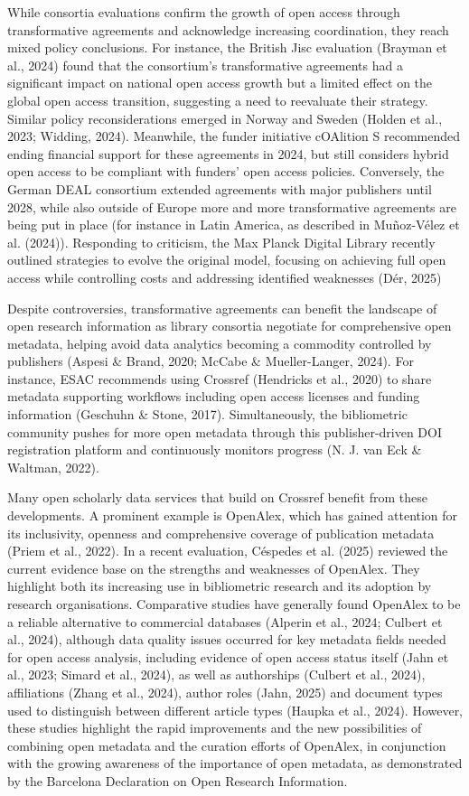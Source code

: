 \documentclass[a4paper,man,floatsintext,longtable,noextraspace,10pt]{apa6}
\begin{document}
While consortia evaluations confirm the growth of open access through
transformative agreements and acknowledge increasing coordination, they
reach mixed policy conclusions. For instance, the British Jisc
evaluation (Brayman et al., 2024) found that the consortium's
transformative agreements had a significant impact on national open
access growth but a limited effect on the global open access transition,
suggesting a need to reevaluate their strategy. Similar policy
reconsiderations emerged in Norway and Sweden (Holden et al., 2023;
Widding, 2024). Meanwhile, the funder initiative cOAlition S recommended
ending financial support for these agreements in 2024, but still
considers hybrid open access to be compliant with funders' open access
policies. Conversely, the German DEAL consortium extended agreements
with major publishers until 2028, while also outside of Europe more and
more transformative agreements are being put in place (for instance in
Latin America, as described in Muñoz-Vélez et al. (2024)). Responding to
criticism, the Max Planck Digital Library recently outlined strategies
to evolve the original model, focusing on achieving full open access
while controlling costs and addressing identified weaknesses (Dér, 2025)

Despite controversies, transformative agreements can benefit the
landscape of open research information as library consortia negotiate
for comprehensive open metadata, helping avoid data analytics becoming a
commodity controlled by publishers (Aspesi \& Brand, 2020; McCabe \&
Mueller-Langer, 2024). For instance, ESAC recommends using Crossref
(Hendricks et al., 2020) to share metadata supporting workflows
including open access licenses and funding information (Geschuhn \&
Stone, 2017). Simultaneously, the bibliometric community pushes for more
open metadata through this publisher-driven DOI registration platform
and continuously monitors progress (N. J. van Eck \& Waltman, 2022).

Many open scholarly data services that build on Crossref benefit from
these developments. A prominent example is OpenAlex, which has gained
attention for its inclusivity, openness and comprehensive coverage of
publication metadata (Priem et al., 2022). In a recent evaluation,
Céspedes et al. (2025) reviewed the current evidence base on the
strengths and weaknesses of OpenAlex. They highlight both its increasing
use in bibliometric research and its adoption by research organisations.
Comparative studies have generally found OpenAlex to be a reliable
alternative to commercial databases (Alperin et al., 2024; Culbert et
al., 2024), although data quality issues occurred for key metadata
fields needed for open access analysis, including evidence of open
access status itself (Jahn et al., 2023; Simard et al., 2024), as well
as authorships (Culbert et al., 2024), affiliations (Zhang et al.,
2024), author roles (Jahn, 2025) and document types used to distinguish
between different article types (Haupka et al., 2024). However, these
studies highlight the rapid improvements and the new possibilities of
combining open metadata and the curation efforts of OpenAlex, in
conjunction with the growing awareness of the importance of open
metadata, as demonstrated by the Barcelona Declaration on Open Research
Information.
\end{document}
